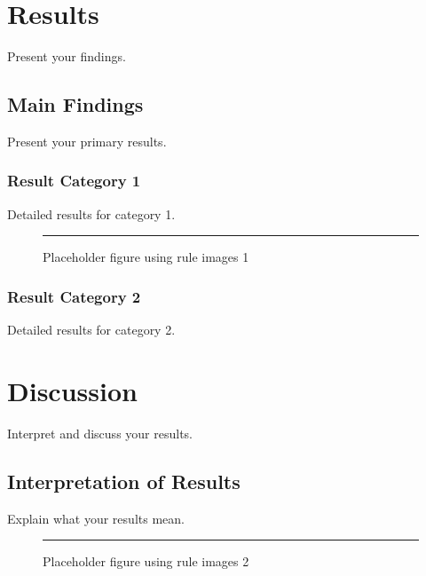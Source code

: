 \chapter{Results}

Present your findings. 

\section{Main Findings}

Present your primary results.

\subsection{Result Category 1}

Detailed results for category 1. 

\begin{figure}[ht]
    \centering
    \rule{0.8\textwidth}{2in}
    \caption{Placeholder figure using rule images 1}
    \label{fig:example1}
\end{figure}

\subsection{Result Category 2}

Detailed results for category 2.

\chapter{Discussion}

Interpret and discuss your results.

\section{Interpretation of Results}

Explain what your results mean. 
\begin{figure}[ht]
    \centering
    \rule{0.8\textwidth}{1in}
    \caption{Placeholder figure using rule images 2}
    \label{fig:example2}
\end{figure}

